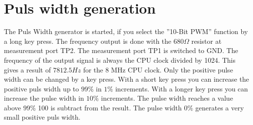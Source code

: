 \section{Puls width generation}
The Puls Width generator is started, if you select the ''10-Bit PWM'' function by
a long key press.
The frequency output is done with the \(680\Omega\) resistor at measurement port TP2.
The measurement port TP1 is switched to GND.
The frequency of the output signal is always the CPU clock divided by 1024.
This gives a result of \(7812.5Hz\) for the 8 MHz CPU clock.
Only the positive pulse width can be changed by a key press. With a short key press
you can increase the positive puls width up to \(99\%\) in \(1\%\) increments.
With a longer key press you can increase the pulse width in \(10\%\) increments.
The pulse width reaches a value above \(99\%\) 100 is subtract from the result.
The pulse width \(0\%\) generates a very small positive puls width.

